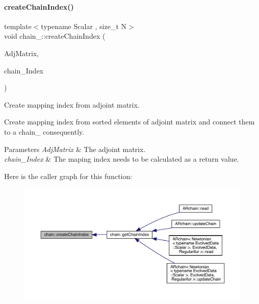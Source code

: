 \paragraph{\texorpdfstring{create\+Chain\+Index()}{createChainIndex()}}
{\footnotesize\ttfamily template$<$typename Scalar , size\+\_\+t N$>$ \\
void chain_\+::create\+Chain\+Index (\begin{DoxyParamCaption}\item[{\mbox{\hyperlink{namespacechain_a3a021b84403e03113e1dcd61ba304963}{Node\+Array}}$<$ Scalar, N $\ast$(N -\/ 1)/2 $>$ \&}]{Adj\+Matrix,  }\item[{\mbox{\hyperlink{namespacechain_aa40d2da395c0ac2bc5f37832442ac403}{Index\+Array}}$<$ N $>$ \&}]{chain_\+Index }\end{DoxyParamCaption})}



Create mapping index from adjoint matrix. 

Create mapping index from sorted elements of adjoint matrix and connect them to a chain_ consequently.
\begin{DoxyParams}{Parameters}
{\em Adj\+Matrix} & The adjoint matrix. \\
\hline
{\em chain_\+Index} & The maping index needs to be calculated as a return value. \\
\hline
\end{DoxyParams}
Here is the caller graph for this function\+:\nopagebreak
\begin{figure}[H]
\begin{center}
\leavevmode
\includegraphics[width=350pt]{namespacechain_ae008a8273beabf1473c347994197ef53_icgraph}
\end{center}
\end{figure}
\mbox{\label{namespacechain_a3e7b0a001442f121ce1408e7c9d12016}} 
